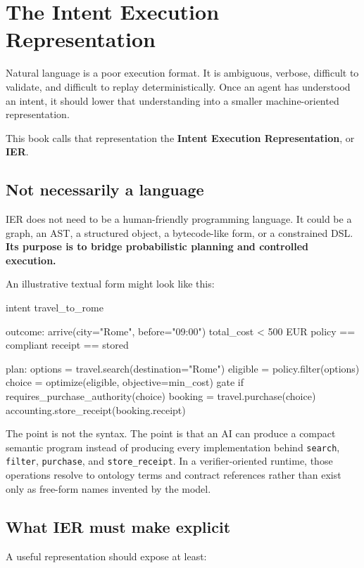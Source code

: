 \documentclass[10pt,oneside,openany]{book}
\newcommand{\term}[1]{\textbf{#1}}
\newcommand{\mono}[1]{\texttt{#1}}
\begin{document}
\chapter{The Intent Execution Representation}\label{ch:ier}

Natural language is a poor execution format. It is ambiguous, verbose, difficult to validate, and difficult to replay deterministically. Once an agent has understood an intent, it should lower that understanding into a smaller machine-oriented representation.

This book calls that representation the \term{Intent Execution Representation}, or \term{IER}.

\section{Not necessarily a language}
IER does not need to be a human-friendly programming language. It could be a graph, an AST, a structured object, a bytecode-like form, or a constrained DSL. \textbf{Its purpose is to bridge probabilistic planning and controlled execution.}

An illustrative textual form might look like this:

\begin{codeblock}
intent travel_to_rome {
  outcome:
    arrive(city="Rome", before="09:00")
    total_cost < 500 EUR
    policy == compliant
    receipt == stored

  plan:
    options = travel.search(destination="Rome")
    eligible = policy.filter(options)
    choice = optimize(eligible, objective=min_cost)
    gate if requires_purchase_authority(choice)
    booking = travel.purchase(choice)
    accounting.store_receipt(booking.receipt)
}
\end{codeblock}

The point is not the syntax. The point is that an AI can produce a compact semantic program instead of producing every implementation behind \mono{search}, \mono{filter}, \mono{purchase}, and \mono{store\_receipt}. In a verifier-oriented runtime, those operations resolve to ontology terms and contract references rather than exist only as free-form names invented by the model.

\section{What IER must make explicit}
A useful representation should expose at least:
\end{document}
